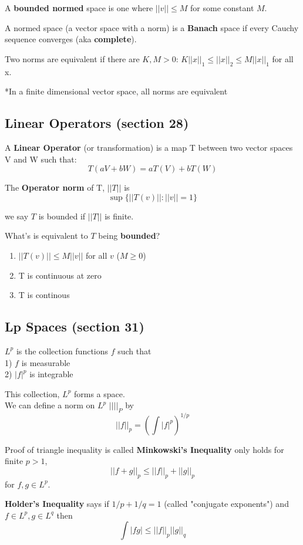 \documentclass[a4paper, 12pt]{article}
\newcommand{\bt}[1]{\textbf{#1}} %
\begin{document}
\begin{multicols}{2}
A \bt{bounded normed} space is one where $||v|| \leq M$ for some constant $M$.

A normed space (a vector space with a norm) is a \bt{Banach} space if every Cauchy sequence
converges (aka \bt{complete}).

Two norms are equivalent if there are $K, M > 0$: 
$K ||x||_1 \leq ||x||_2 \leq M ||x||_1$ for all x.

*In a finite dimensional vector space, all norms are equivalent

\subsection{Linear Operators (section 28)}

A \bt{Linear Operator} (or transformation) is a map T between two 
vector spaces V and W such that: 
$$T(aV + bW) = aT(V) + bT(W)$$

The \bt{Operator norm} of T, $||T||$ is 
$$\sup\{ ||T(v) ||: ||v|| = 1\}$$

we say $T$ is bounded if $||T||$ is finite.

What's is equivalent to $T$ being \bt{bounded}?
\begin{enumerate}
    \item $||T(v)|| \leq M ||v||$ for all $v$ ($M \geq 0$)
    \item T is continuous at zero
    \item T is continous
\end{enumerate}

\subsection{Lp Spaces (section 31)}

$L^p$ is the collection functions $f$ such that \\
1) $f$ is measurable\\
2) $|f|^p$ is integrable

This collection, $L^p$ forms a space. \\
We can define a norm on $L^p$ $|| ||_P$ by 
$$|| f||_p = (\int |f|^p)^{1/p}$$

Proof of triangle inequality is called \bt{Minkowski's Inequality}
only holds for finite $p > 1$, 
$$||f + g ||_p \leq ||f||_p + ||g||_p$$
for $f, g \in L^p$.

\bt{Holder's Inequality} says if $1/p + 1/q = 1$ (called "conjugate exponents")
and $f \in L^p, g \in L^q$ then 
$$\int |fg| \leq ||f||_p ||g||_q$$


\end{multicols}
\end{document}
